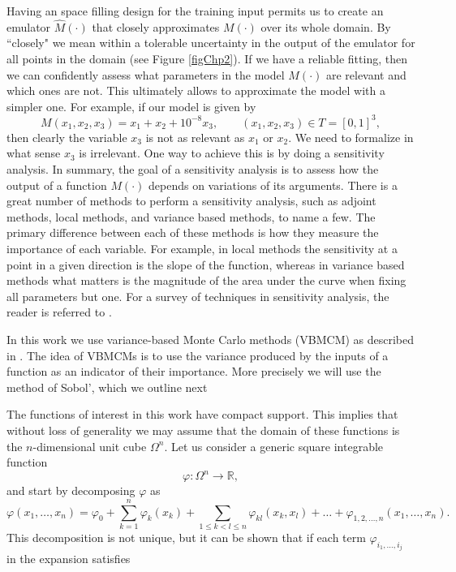 \documentclass[12pt]{book}
\begin{document}
Having an space filling design for the training input permits us to create an
emulator $\widehat{M}(\cdot)$ that closely approximates $M(\cdot)$  over its whole domain. 
By ``closely" we mean within a tolerable uncertainty in the output of the emulator 
for all points in the domain (see Figure \ref{figChp2}).
If we have a reliable fitting, then we can confidently assess what parameters in the model $M(\cdot)$
are relevant and which ones are not.
This ultimately allows to approximate  the model  with a simpler one.
For example, if our model is given by 
\begin{equation*}
M(x_{1},x_{2},x_{3})=x_{1}+x_{2}+10^{-8}x_{3},\qquad(x_{1},x_{2},x_{3})\in  T=[0,1]^{3},
\end{equation*}
then clearly the variable $x_{3}$ is not as relevant as $x_{1}$ or  $x_{2}$. We need to
formalize in what sense $x_{3}$ is irrelevant. One way to achieve this is by doing a 
sensitivity analysis. In summary, the goal of a
sensitivity analysis is to assess how
the output of a function $M(\cdot)$ depends on variations of its arguments. There is
a great number of methods to perform a sensitivity analysis, such as adjoint methods, local
methods, and variance based methods, to name a few. The primary difference between each of these
methods is how they measure the importance of each variable. For example, in local methods
the sensitivity at a point in a given direction is the slope of the function, whereas in
variance based methods what matters is the magnitude of the area under the curve when
fixing all parameters but one.
For a survey of techniques in sensitivity analysis, 
the reader is referred to \cite{saltelli2000sensitivity}. 

In this work we  use 
variance-based Monte Carlo methods (VBMCM) as described in \cite{sobol1993sensitivity}.
The idea of  VBMCMs is to use the variance produced by  the inputs of a function as an indicator of 
their importance. More precisely we will use the method of Sobol', which we outline next


The functions of interest in this work have compact support. This implies that
without loss of generality we may assume that  the domain of these functions 
is the $n$-dimensional unit cube $\Omega^{n}$. Let us consider a generic
square integrable function
\begin{equation*}
\varphi:\Omega^{n}\rightarrow\mathbb{R},
\end{equation*}
and start by decomposing $\varphi$ as 
\begin{equation*}
\varphi(x_{1},\ldots,x_{n})=\varphi_{0}+\sum_{k=1}^{n}\varphi_{k}(x_{k})+
\sum_{1\leq k< l\leq n}\varphi_{kl}(x_{k},x_{l})+\ldots+
\varphi_{1,2,\ldots,n}(x_{1},\ldots,x_{n}).
\end{equation*}
This decomposition is not unique, but it can be shown that if each term $\varphi_{i_{1},\ldots,i_{j}}$
in the expansion satisfies
\end{document}
